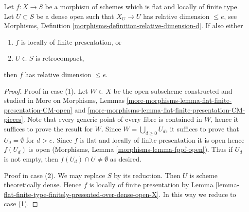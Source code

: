 \begin{lemma}
\label{lemma-flat-finite-presentation-dimension-over-dense-open}
Let $f : X \to S$ be a morphism of schemes which is flat and locally
of finite type. Let $U \subset S$ be a dense open such that
$X_U \to U$ has relative dimension $\leq e$, see
Morphisms, Definition \ref{morphisms-definition-relative-dimension-d}.
If also either
\begin{enumerate}
\item $f$ is locally of finite presentation, or
\item $U \subset S$ is retrocompact,
\end{enumerate}
then $f$ has relative dimension $\leq e$.
\end{lemma}

\begin{proof}
Proof in case (1). Let $W \subset X$ be the open subscheme constructed
and studied in More on Morphisms, Lemmas
\ref{more-morphisms-lemma-flat-finite-presentation-CM-open} and
\ref{more-morphisms-lemma-flat-finite-presentation-CM-pieces}.
Note that every generic point of every fibre is contained in $W$,
hence it suffices to prove the result for $W$. Since
$W = \bigcup_{d \geq 0} U_d$, it suffices to prove that $U_d = \emptyset$
for $d > e$. Since $f$ is flat and locally of finite presentation it is open
hence $f(U_d)$ is open (Morphisms, Lemma \ref{morphisms-lemma-fppf-open}).
Thus if $U_d$ is not empty, then $f(U_d) \cap U \not = \emptyset$ as
desired.

\medskip\noindent
Proof in case (2). We may replace $S$ by its reduction. Then $U$ is
scheme theoretically dense. Hence $f$ is locally of finite presentation
by Lemma \ref{lemma-flat-finite-type-finitely-presented-over-dense-open-X}.
In this way we reduce to case (1).
\end{proof}
